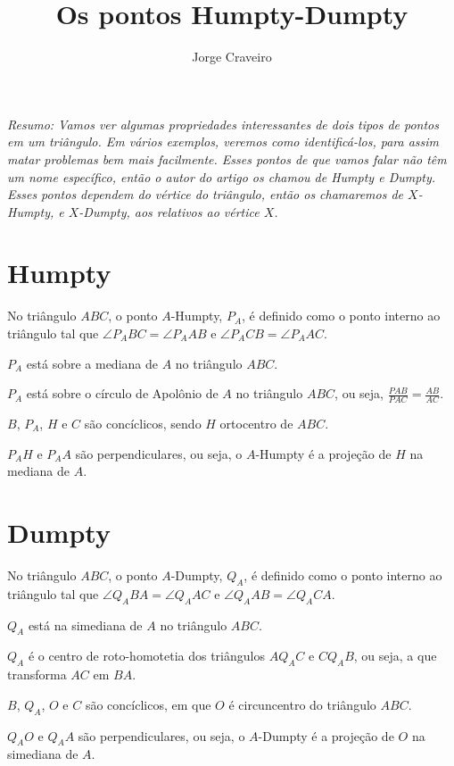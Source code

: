 \documentclass[10pt, a4paper]{article}
\title{Os pontos Humpty-Dumpty}
\author{Jorge Craveiro}
\begin{document}
	
	\zeustitle
	\begin{center}
		\begin{minipage}{0.8\textwidth}
			\itshape Resumo: Vamos ver algumas propriedades interessantes de dois tipos de pontos em um triângulo.
			Em vários exemplos, veremos como identificá-los, para assim matar problemas bem mais facilmente.
			Esses pontos de que vamos falar não têm um nome específico, então o autor do artigo os chamou de Humpty e Dumpty.
			Esses pontos dependem do vértice do triângulo, então os chamaremos de $X$-Humpty, e $X$-Dumpty, aos relativos ao vértice $X$.	
		\end{minipage}
	\end{center}
	
	\section{Humpty}
	\begin{defn}
		No triângulo $ABC$, o ponto $A$-Humpty, $P_A$, é definido como o ponto interno ao triângulo tal que $\angle P_ABC = \angle P_AAB$ e $\angle P_ACB = \angle P_AAC$.
	\end{defn}
	\begin{prop}
		$P_A$ está sobre a mediana de $A$ no triângulo $ABC$.
	\end{prop}
	\begin{prop}
		$P_A$ está sobre o círculo de Apolônio de $A$ no triângulo $ABC$, ou seja, $\frac{PAB}{PAC} = \frac{AB}{AC}$.
	\end{prop}
	\begin{prop}
		$B$, $P_A$, $H$ e $C$ são concíclicos, sendo $H$ ortocentro de $ABC$.
	\end{prop}
	\begin{prop}
		$P_AH$ e $P_AA$ são perpendiculares, ou seja, o $A$-Humpty é a projeção de $H$ na mediana de $A$.
	\end{prop}

	\section{Dumpty}
	\begin{defn}
		No triângulo $ABC$, o ponto $A$-Dumpty, $Q_A$, é definido como o ponto interno ao triângulo tal que $\angle Q_ABA = \angle Q_AAC$ e $\angle Q_AAB = \angle Q_ACA$.
	\end{defn}
	\begin{prop}
		$Q_A$ está na simediana de $A$ no triângulo $ABC$.
	\end{prop}
	\begin{prop}
		$Q_A$ é o centro de roto-homotetia dos triângulos $AQ_AC$ e $CQ_AB$, ou seja, a que transforma $AC$ em $BA$.
	\end{prop}
	\begin{prop}
		$B$, $Q_A$, $O$ e $C$ são concíclicos, em que $O$ é circuncentro do triângulo $ABC$.
	\end{prop}
	\begin{prop}
		$Q_AO$ e $Q_AA$ são perpendiculares, ou seja, o $A$-Dumpty é a projeção de $O$ na simediana de $A$.
	\end{prop}
	
\end{document}
